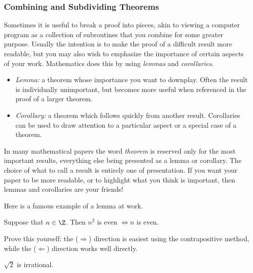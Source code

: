 \subsubsection*{Combining and Subdividing Theorems}

Sometimes it is useful to break a proof into pieces, akin to viewing a computer program as a collection of subroutines that you combine for some greater purpose. Usually the intention is to make the proof of a difficult result more readable, but you may also wish to emphasize the importance of certain aspects of your work. Mathematics does this by using \emph{lemmas} and \emph{corollaries.}

\begin{itemize}\setlength{\itemsep}{0pt}
  \item[]\emph{Lemma:} a theorem whose importance you want to downplay. Often the result is individually unimportant, but becomes more useful when referenced in the proof of a larger theorem.
  \item[]\emph{Corollary:} a theorem which follows quickly from another result. Corollaries can be used to draw attention to a particular aspect or a special case of a theorem.
\end{itemize}

\noindent In many mathematical papers the word \emph{theorem} is reserved only for the most important results, everything else being presented as a lemma or corollary. The choice of what to call a result is entirely one of presentation. If you want your paper to be more readable, or to highlight what you think is important, then lemmas and corollaries are your friends!\pagebreak[2]

\noindent Here is a famous example of a lemma at work.

\begin{lemm}\label{lemm:root2prep}
Suppose that $n\in\Z$. Then $n^2$ is even $\iff n$ is even.
\end{lemm}

\noindent Prove this yourself: the ($\Rightarrow$) direction is easiest using the contrapositive method, while the ($\Leftarrow$) direction works well directly.

\begin{thm}
$\sqrt 2$ is irrational.
\end{thm}

